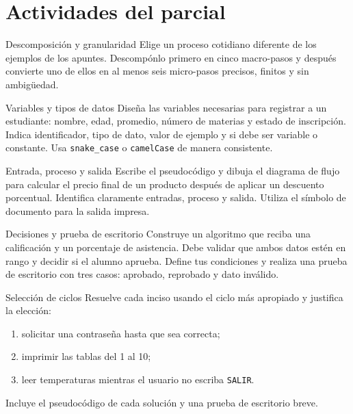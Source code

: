 \clearpage
\section{Actividades del parcial}

\begin{actividad}{Descomposición y granularidad}
Elige un proceso cotidiano diferente de los ejemplos de los apuntes.
Descompónlo primero en cinco macro-pasos y después convierte uno de ellos en
al menos seis micro-pasos precisos, finitos y sin ambigüedad.
\espaciorespuesta[6cm]
\end{actividad}

\clearpage
\begin{actividad}{Variables y tipos de datos}
Diseña las variables necesarias para registrar a un estudiante: nombre, edad,
promedio, número de materias y estado de inscripción. Indica identificador,
tipo de dato, valor de ejemplo y si debe ser variable o constante. Usa
\texttt{snake\_case} o \texttt{camelCase} de manera consistente.
\espaciorespuesta[6cm]
\end{actividad}

\clearpage
\begin{actividad}{Entrada, proceso y salida}
Escribe el pseudocódigo y dibuja el diagrama de flujo para calcular el precio
final de un producto después de aplicar un descuento porcentual. Identifica
claramente entradas, proceso y salida. Utiliza el símbolo de documento para la
salida impresa.
\espaciorespuesta[8cm]
\end{actividad}

\clearpage
\begin{actividad}{Decisiones y prueba de escritorio}
Construye un algoritmo que reciba una calificación y un porcentaje de
asistencia. Debe validar que ambos datos estén en rango y decidir si el alumno
aprueba. Define tus condiciones y realiza una prueba de escritorio con tres
casos: aprobado, reprobado y dato inválido.
\espaciorespuesta[9cm]
\end{actividad}

\clearpage
\begin{actividad}{Selección de ciclos}
Resuelve cada inciso usando el ciclo más apropiado y justifica la elección:
\begin{enumerate}[leftmargin=*]
  \item solicitar una contraseña hasta que sea correcta;
  \item imprimir las tablas del 1 al 10;
  \item leer temperaturas mientras el usuario no escriba \texttt{SALIR}.
\end{enumerate}
Incluye el pseudocódigo de cada solución y una prueba de escritorio breve.
\espaciorespuesta[11cm]
\end{actividad}

